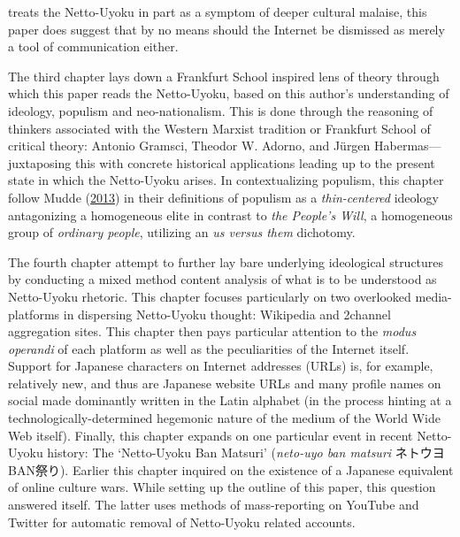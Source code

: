\documentclass[10pt,british,A4paper,oneside]{memoir}
\begin{document}
treats the Netto-Uyoku in part as a symptom of deeper cultural malaise,
this paper does suggest that by no means should the Internet be
dismissed as merely a tool of communication either.

The third chapter lays down a Frankfurt School inspired lens of theory
through which this paper reads the Netto-Uyoku, based on this author's
understanding of ideology, populism and neo-nationalism. This is done
through the reasoning of thinkers associated with the Western Marxist
tradition or Frankfurt School of critical theory: Antonio Gramsci,
Theodor W. Adorno, and Jürgen Habermas---juxtaposing this with concrete
historical applications leading up to the present state in which the
Netto-Uyoku arises. In contextualizing populism, this chapter follow
Mudde (\protect\hyperlink{ref-mudde_oxford_2013}{2013}) in their
definitions of populism as a \emph{thin-centered} ideology antagonizing
a homogeneous elite in contrast to \emph{the People's Will}, a
homogeneous group of \emph{ordinary people}, utilizing an \emph{us
versus them} dichotomy.

The fourth chapter attempt to further lay bare underlying ideological
structures by conducting a mixed method content analysis of what is to
be understood as Netto-Uyoku rhetoric. This chapter focuses particularly
on two overlooked media-platforms in dispersing Netto-Uyoku thought:
Wikipedia and 2channel aggregation sites. This chapter then pays
particular attention to the \emph{modus operandi} of each platform as
well as the peculiarities of the Internet itself. Support for Japanese
characters on Internet addresses (URLs) is, for example, relatively new,
and thus are Japanese website URLs and many profile names on social made
dominantly written in the Latin alphabet (in the process hinting at a
technologically-determined hegemonic nature of the medium of the World
Wide Web itself). Finally, this chapter expands on one particular event
in recent Netto-Uyoku history: The `Netto-Uyoku Ban Matsuri'
(\emph{neto-uyo ban matsuri} ネトウヨBAN祭り). Earlier this chapter
inquired on the existence of a Japanese equivalent of online culture
wars. While setting up the outline of this paper, this question answered
itself. The latter uses methods of mass-reporting on YouTube and Twitter
for automatic removal of Netto-Uyoku related accounts.
\end{document}
